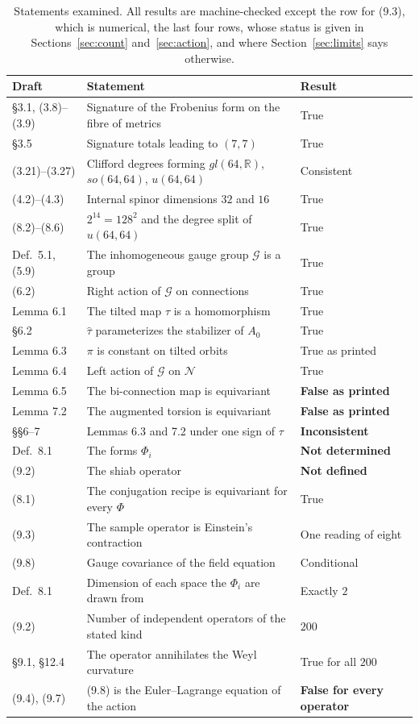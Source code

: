 \documentclass[11pt]{article}
\theoremstyle{remark}
\begin{document}
\begin{table}[h]
\centering\small
\begin{tabular}{@{}lll@{}}
\toprule
Draft & Statement & Result \\
\midrule
\S3.1, (3.8)--(3.9) & Signature of the Frobenius form on the fibre of metrics & True \\
\S3.5 & Signature totals leading to $(7,7)$ & True \\
(3.21)--(3.27) & Clifford degrees forming $gl(64,\mathbb R)$, $so(64,64)$, $u(64,64)$ & Consistent \\
(4.2)--(4.3) & Internal spinor dimensions $32$ and $16$ & True \\
(8.2)--(8.6) & $2^{14}=128^2$ and the degree split of $u(64,64)$ & True \\
Def.~5.1, (5.9) & The inhomogeneous gauge group $\mathcal G$ is a group & True \\
(6.2) & Right action of $\mathcal G$ on connections & True \\
Lemma 6.1 & The tilted map $\tau$ is a homomorphism & True \\
\S6.2 & $\hat\tau$ parameterizes the stabilizer of $A_0$ & True \\
Lemma 6.3 & $\pi$ is constant on tilted orbits & True as printed \\
Lemma 6.4 & Left action of $\mathcal G$ on $\mathcal N$ & True \\
Lemma 6.5 & The bi-connection map is equivariant & \textbf{False as printed} \\
Lemma 7.2 & The augmented torsion is equivariant & \textbf{False as printed} \\
\S\S6--7 & Lemmas 6.3 and 7.2 under one sign of $\tau$ & \textbf{Inconsistent} \\
Def.~8.1 & The forms $\Phi_i$ & \textbf{Not determined} \\
(9.2) & The shiab operator & \textbf{Not defined} \\
(8.1) & The conjugation recipe is equivariant for every $\Phi$ & True \\
(9.3) & The sample operator is Einstein's contraction & One reading of eight \\
(9.8) & Gauge covariance of the field equation & Conditional \\
Def.~8.1 & Dimension of each space the $\Phi_i$ are drawn from & Exactly $2$ \\
(9.2) & Number of independent operators of the stated kind & $200$ \\
\S9.1, \S12.4 & The operator annihilates the Weyl curvature & True for all $200$ \\
(9.4), (9.7) & (9.8) is the Euler--Lagrange equation of the action & \textbf{False for every operator} \\
\bottomrule
\end{tabular}
\caption{Statements examined. All results are machine-checked except the row for (9.3), which is numerical, the last four rows, whose status is given in Sections~\ref{sec:count} and~\ref{sec:action}, and where Section~\ref{sec:limits} says otherwise.}
\label{tab}
\end{table}
\end{document}

